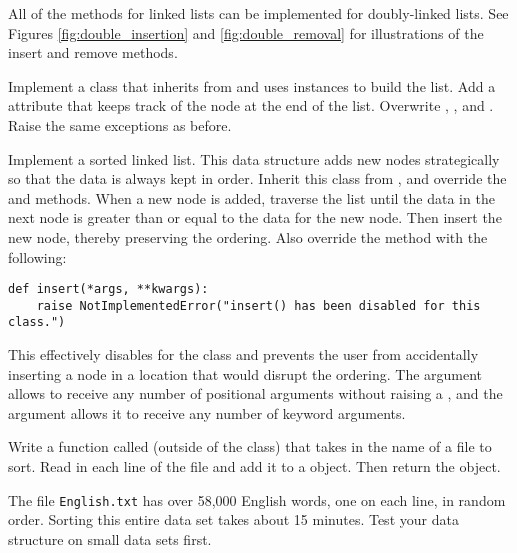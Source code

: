 All of the methods for linked lists can be implemented for doubly-linked lists.
See Figures \ref{fig:double_insertion} and \ref{fig:double_removal} for illustrations of the insert and remove methods.

\begin{problem}
Implement a  class that inherits from  and uses  instances to build the list.
Add a  attribute that keeps track of the node at the end of the list.
Overwrite , , and .
Raise the same exceptions as before.
\end{problem}

\begin{problem}
Implement a sorted linked list.
This data structure adds new nodes strategically so that the data is always kept in order.
Inherit this class from , and override the  and  methods.
When a new node is added, traverse the list until the data in the next node is greater than or equal to the data for the new node.
Then insert the new node, thereby preserving the ordering.
Also override the  method with the following:

\begin{lstlisting}
def insert(*args, **kwargs):
    raise NotImplementedError("insert() has been disabled for this class.")
\end{lstlisting}

This effectively disables  for the  class and prevents the user from accidentally inserting a node in a location that would disrupt the ordering.
The  argument allows  to receive any number of positional arguments without raising a , and the  argument allows it to receive any number of keyword arguments.

Write a function called  (outside of the class) that takes in the name of a file to sort.
Read in each line of the file and add it to a  object.
Then return the object.

\begin{warn}
The file \texttt{English.txt} has over 58,000 English words, one on each line, in random order.
Sorting this entire data set takes about 15 minutes.
Test your data structure on small data sets first.
\end{warn}
\end{problem}

